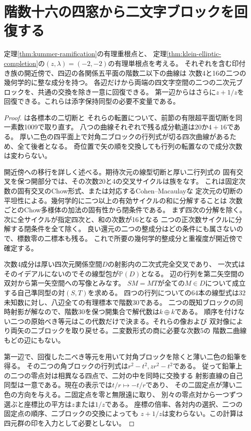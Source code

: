 \section{階数十六の四窓から二文字ブロックを回復する}
\label{sec:rank-two-block-recovery}
\begin{theorem}\label{thm:rank-two-block-recovery}
定理\ref{thm:kummer-ramification}の有理重根点と、
定理\ref{thm:klein-elliptic-completion}の$(z,\lambda)=(-2,-2)$の有理単根点を考える。
それぞれを含む印付き族の開近傍で、四辺の各関係五平面の階数二以下の曲線は
次数4と16の二つの幾何学的に整な成分を持つ。
各辺だけから両端の四文字空間の二つの二次元ブロックを、共通の交換を除き一意に回復できる。
第一辺からはさらに$z+1/z$を回復できる。これらは添字保持同型の必要不変量である。
\end{theorem}
\begin{proof}
は各標本の二切断と
それらの転置について、前節の有限超平面切断を同一素数1009で取り直す。
八つの曲線それぞれで残る成分軌道は$20$か$4+16$である。
厚い二色の四平面上で対角二ブロックの行列式が切る四次曲線があるため、全て後者となる。
奇位置で矢の順を交換しても行列の転置なので成分次数は変わらない。

開近傍への移行を詳しく述べる。期待次元の線型切断と厚い二行列式の
固有交叉を保つ開部分では、その次数20と4の交叉サイクルは族をなす。
これは固定次数の固有交叉のChow形式、または対応するCohen--Macaulayな
定次元の切断の平坦性による。幾何学的に二つ以上の有効サイクルの和に分解することは
次数ごとのChow多様体の加法の固有性から閉条件である。
まず四次の分解を除く。次に全サイクルが指定四次と、和の次数が16となる
二つの正次数サイクルに分解する閉条件を全て除く。
良い還元の二つの整成分はどの条件にも属さないので、標数零の二標本も残る。
これで所要の幾何学的整成分と重複度が開近傍で確定する。

次数4成分は厚い四次元関係空間$D$の射影内の二次式完全交叉であり、
一次式はそのイデアルにないのでその線型包が$\mathbb P(D)$となる。
辺の行列を第二矢空間の双対から第一矢空間への写像とみなす。
$SM=MT$が全ての$M\in D$について成立する自己準同型の対$(S,T)$を求める。
四つの行列についての64本の線型式は32未知数に対し、八辺全ての有理標本で階数30である。
二つの既知ブロックの同時射影が解なので、階数30を保つ開集合で解代数は$k\oplus k$である。
順序を付けない二つの原始べき等元はこの代数だけで決まる。それらの像および
双対像により両矢の二ブロックを取り戻せる。二変数形式の商に必要な次数5の
階数二曲線もどの辺にもない。

第一辺で、回復した二べき等元を用いて対角ブロックを除くと薄い二色の鉛筆を得る。
その二つの角ブロックの行列式は$r^2-t^2,zr^2-t^2$である。
従って鉛筆上の二つの零点対は相異なる四点で、二対の中を同時に交換する
射影直線の自己同型は一意である。現在の表示では$t/r\mapsto-t/r$であり、
その二固定点が薄い二色の方向を与える。二固定点を零と無限遠に取り、
別々の零点対から一つずつ選ぶと座標比の平方は$z$または$1/z$である。
座標の倍率、各対内の選択、二つの固定点の順序、二ブロックの交換によっても
$z+1/z$は変わらない。この計算は四元群の印を入力として必要としない。
\end{proof}

